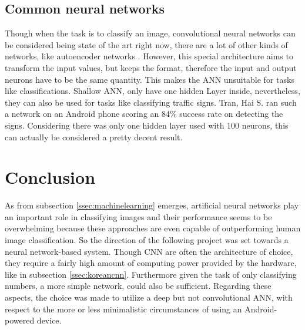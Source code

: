 \subsection{Common neural networks}
Though when the task is to classify an image, convolutional neural networks can be considered being state of the art right now, there are a lot of other kinds of networks, like autoencoder networks \cite{bengio}. However, this special architecture aims to transform the input values, but keeps the format, therefore the input and output neurons have to be the same quantity. This makes the ANN unsuitable for tasks like classifications.\newline
Shallow ANN, only have one hidden Layer inside, nevertheless, they can also be used for tasks like classifying traffic signs. Tran, Hai S. ran such a network on an Android phone scoring an 84\% success rate on detecting the signs\cite{tran}. Considering there was only one hidden layer used with 100 neurons, this can actually be considered a pretty decent result.

\newpage
\section{Conclusion}
As from subsection \ref{ssec:machinelearning} emerges, artificial neural networks play an important role in classifying images and their performance seems to be overwhelming because these approaches are even capable of outperforming human image classification. So the direction of the following project was set towards a neural network-based system. Though CNN are often the architecture of choice, they require a fairly high amount of computing power provided by the hardware, like in subsection \ref{ssec:koreancnn}. Furthermore given the task of only classifying numbers, a more simple network, could also be sufficient. Regarding these aspects, the choice was made to utilize a deep but not convolutional ANN, with respect to the more or less minimalistic circumstances of using an Android-powered device.